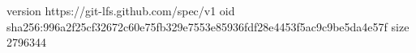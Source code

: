 version https://git-lfs.github.com/spec/v1
oid sha256:996a2f25cf32672c60e75fb329e7553e85936fdf28e4453f5ac9c9be5da4e57f
size 2796344
